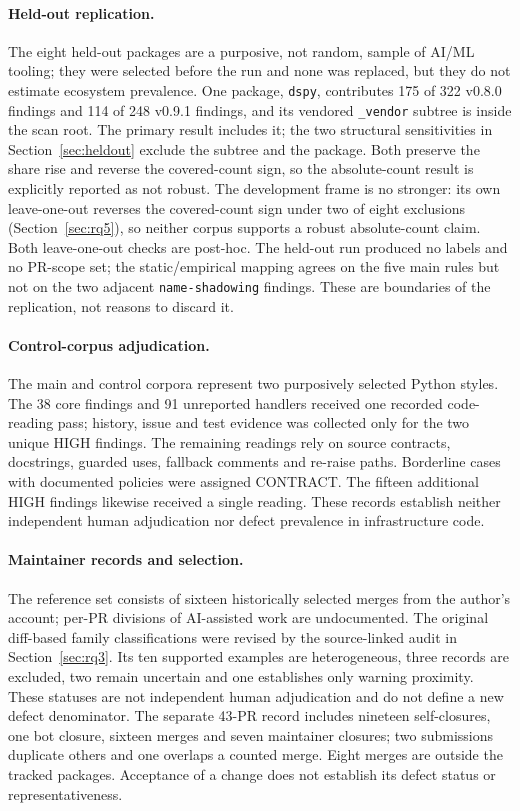 \documentclass[10pt,a4paper]{article}
\begin{document}
\paragraph{Held-out replication.}
The eight held-out packages are a purposive, not random, sample of AI/ML
tooling; they were selected before the run and none was replaced, but they do
not estimate ecosystem prevalence. One package, \texttt{dspy}, contributes
175 of 322 v0.8.0 findings and 114 of 248 v0.9.1 findings, and its vendored
\texttt{\_vendor} subtree is inside the scan root. The primary result includes
it; the two structural sensitivities in Section~\ref{sec:heldout} exclude the
subtree and the package. Both preserve the share rise and reverse the
covered-count sign, so the absolute-count result is explicitly reported as
not robust. The development frame is no stronger: its own leave-one-out
reverses the covered-count sign under two of eight exclusions
(Section~\ref{sec:rq5}), so neither corpus supports a robust absolute-count
claim. Both leave-one-out checks are post-hoc. The held-out run produced no
labels and no PR-scope set; the
static/empirical mapping agrees on the five main rules but not on the two
adjacent \texttt{name-shadowing} findings. These are boundaries of the
replication, not reasons to discard it.

\paragraph{Control-corpus adjudication.}
The main and control corpora represent two purposively selected Python
styles. The 38 core findings and 91 unreported handlers received one
recorded code-reading pass;
history, issue and test evidence was collected only for the two unique
HIGH findings. The remaining readings rely on source contracts,
docstrings, guarded uses, fallback comments and re-raise paths.
Borderline cases with documented policies were assigned CONTRACT.
The fifteen additional HIGH findings likewise received a single reading.
These records establish neither independent human adjudication nor defect
prevalence in infrastructure code.

\paragraph{Maintainer records and selection.}
The reference set consists of sixteen historically selected merges from the
author's account; per-PR divisions of AI-assisted work are undocumented.
The original diff-based family classifications were revised by the
source-linked audit in Section~\ref{sec:rq3}. Its ten supported examples
are heterogeneous, three records are excluded, two remain uncertain and
one establishes only warning proximity. These statuses are not independent
human adjudication and do not define a new defect denominator.
The separate 43-PR record includes nineteen self-closures, one bot closure,
sixteen merges and seven maintainer closures; two submissions duplicate
others and one overlaps a counted merge. Eight merges are outside the
tracked packages. Acceptance of a change does not establish its defect
status or representativeness.
\end{document}
